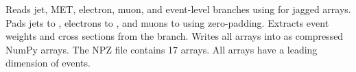 \markdownRendererUlItem Reads jet, MET, electron, muon, and event-level branches using  for jagged arrays.\markdownRendererUlItemEnd 
\markdownRendererUlItem Pads jets to , electrons to , and muons to  using zero-padding.\markdownRendererUlItemEnd 
\markdownRendererUlItem Extracts event weights and cross sections from the  branch.\markdownRendererUlItemEnd 
\markdownRendererUlItem Writes all arrays into  as compressed NumPy arrays.\markdownRendererUlItemEnd 
\markdownRendererUlEndTight \markdownRendererInterblockSeparator
{}
\markdownRendererSectionEnd 
\markdownRendererSectionEnd \markdownRendererSectionBegin
{}\markdownRendererInterblockSeparator
{}The NPZ file  contains 17 arrays. All arrays have a leading dimension of  events.\markdownRendererInterblockSeparator
{}\markdownRendererSectionBegin
{}\markdownRendererInterblockSeparator
